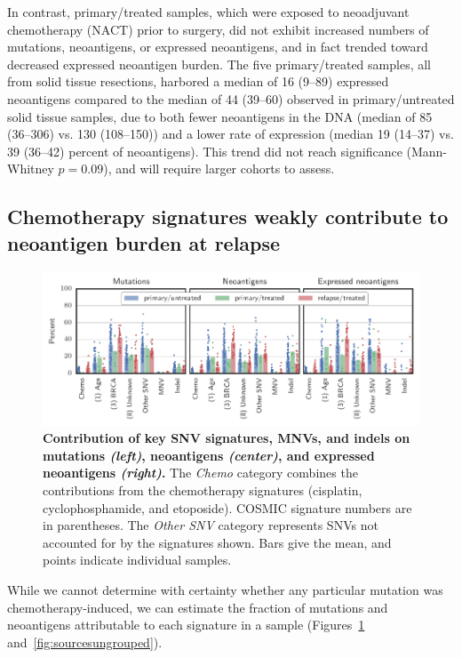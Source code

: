 In contrast, primary/treated samples, which were exposed to neoadjuvant chemotherapy (NACT) prior to surgery, did not exhibit increased numbers of mutations, neoantigens, or expressed neoantigens, and in fact trended toward decreased expressed neoantigen burden. The five primary/treated samples, all from solid tissue resections, harbored a median of 16 (9--89) expressed neoantigens compared to the median of 44 (39--60) observed in primary/untreated solid tissue samples, due to both fewer neoantigens in the DNA (median of 85 (36--306) vs. 130 (108--150)) and a lower rate of expression (median 19 (14--37) vs. 39 (36--42) percent of neoantigens). This trend did not reach significance (Mann-Whitney $p=0.09$), and will require larger cohorts to assess.

\subsection*{Chemotherapy signatures weakly contribute to neoantigen burden at relapse}

\begin{figure}[htbp]
\centering
\includegraphics[scale=1.0]{figures/sources_of_mutations_and_neoantigens.pdf}
\caption{\textbf{Contribution of key SNV signatures, MNVs, and indels on mutations \textit{(left)}, neoantigens \textit{(center)}, and expressed neoantigens \textit{(right)}.} The \textit{Chemo} category combines the contributions from the chemotherapy signatures (cisplatin, cyclophosphamide, and etoposide). COSMIC signature numbers are in parentheses. The \textit{Other SNV} category represents SNVs not accounted for by the signatures shown. Bars give the mean, and points indicate individual samples.}
\label{fig:sources}
\end{figure}


While we cannot determine with certainty whether any particular mutation was chemotherapy-induced, we can estimate the fraction of mutations and neoantigens attributable to each signature in a sample (Figures~\ref{fig:sources} and~\ref{fig:sourcesungrouped}).

